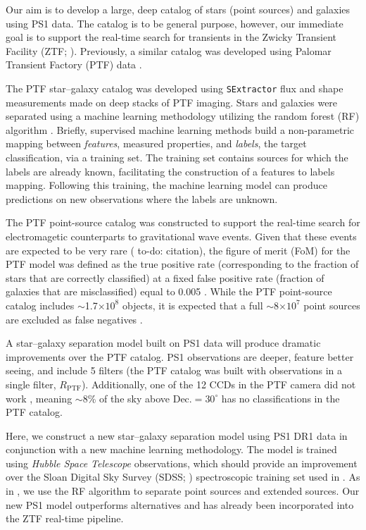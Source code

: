 \documentclass[twocolumn, dvipdfmx]{aastex62}
\newcommand{\todo}[1]{{\color{magenta} to-do: {#1}}}
\begin{document}
Our aim is to develop a large, deep catalog of stars (point sources) and
galaxies using PS1 data. The catalog is to be general purpose, however, our
immediate goal is to support the real-time search for transients in the
Zwicky Transient Facility (ZTF; \citealt{Bellm18}). Previously, a similar
catalog was developed using Palomar Transient Factory (PTF) data
\citep{Miller17}. 

The PTF star--galaxy catalog was developed using \texttt{SExtractor}
\citep{bertin96} flux and shape measurements made on deep stacks of PTF
imaging. Stars and galaxies were separated using a machine learning
methodology utilizing the random forest (RF) algorithm \citep{Breiman01}.
Briefly, supervised machine learning methods build a non-parametric mapping
between \textit{features}, measured properties, and \textit{labels}, the
target classification, via a training set. The training set contains sources
for which the labels are already known, facilitating the construction of a
features to labels mapping. Following this training, the machine learning
model can produce predictions on new observations where the labels are
unknown.

The PTF point-source catalog was constructed to support the real-time search
for electromagetic counterparts to gravitational wave events. Given that
these events are expected to be very rare (\todo{citation}), the figure of
merit (FoM) for the PTF model was defined as the true positive rate
(corresponding to the fraction of stars that are correctly classified) at a
fixed false positive rate (fraction of galaxies that are misclassified) equal
to 0.005 \citep{Miller17}. While the PTF point-source catalog includes
$\sim$1.7$\times 10^8$ objects, it is expected that a full
$\sim$8$\times10^7$ point sources are excluded as false negatives
\citep{Miller17}.

A star--galaxy separation model built on PS1 data will produce dramatic
improvements over the PTF catalog. PS1 observations are deeper, feature
better seeing, and include 5 filters (the PTF catalog was built with
observations in a single filter, $R_\mathrm{PTF}$). Additionally, one of the
12 CCDs in the PTF camera did not work \citep{Law09}, meaning $\sim$8\% of
the sky above $\mathrm{Dec.} = 30^\circ$ has no classifications in the PTF
catalog.

Here, we construct a new star--galaxy separation model using PS1 DR1 data in
conjunction with a new machine learning methodology. The model is trained
using \textit{Hubble Space Telescope} observations, which should provide an
improvement over the Sloan Digital Sky Survey (SDSS; \citealt{York00})
spectroscopic training set used in \citet{Miller17}. As in \citet{Miller17},
we use the RF algorithm to separate point sources and extended sources. Our
new PS1 model outperforms alternatives and has already been incorporated into
the ZTF real-time pipeline.
\end{document}
